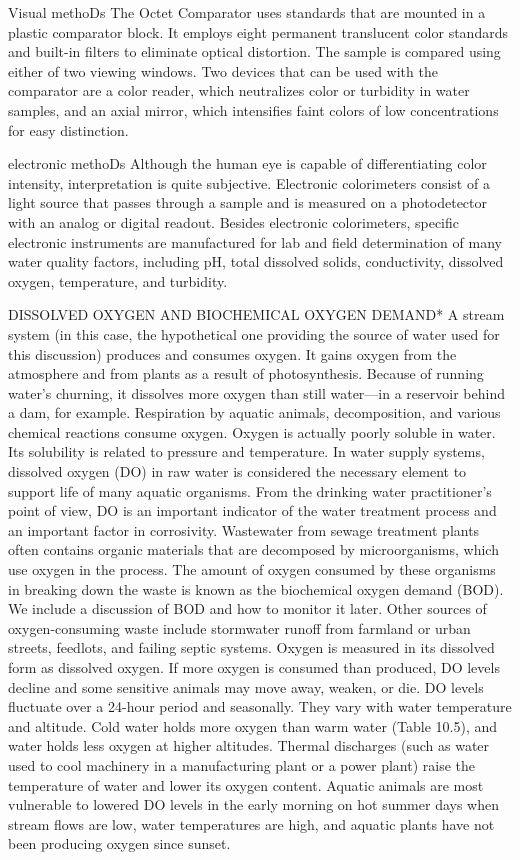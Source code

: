 \documentclass{article}
\begin{document}
Visual methoDs The Octet Comparator uses standards that are mounted in a
plastic comparator block. It employs eight permanent translucent color
standards and built-in filters to eliminate optical distortion. The
sample is compared using either of two viewing windows. Two devices that
can be used with the comparator are a color reader, which neutralizes
color or turbidity in water samples, and an axial mirror, which
intensifies faint colors of low concentrations for easy distinction.

electronic methoDs Although the human eye is capable of differentiating
color intensity, interpretation is quite subjective. Electronic
colorimeters consist of a light source that passes through a sample and
is measured on a photodetector with an analog or digital readout.
Besides electronic colorimeters, specific electronic instruments are
manufactured for lab and field determination of many water quality
factors, including pH, total dissolved solids, conductivity, dissolved
oxygen, temperature, and turbidity.

DISSOLVED OXYGEN AND BIOCHEMICAL OXYGEN DEMAND* A stream system (in this
case, the hypothetical one providing the source of water used for this
discussion) produces and consumes oxygen. It gains oxygen from the
atmosphere and from plants as a result of photosynthesis. Because of
running water's churning, it dissolves more oxygen than still water---in
a reservoir behind a dam, for example. Respiration by aquatic animals,
decomposition, and various chemical reactions consume oxygen. Oxygen is
actually poorly soluble in water. Its solubility is related to pressure
and temperature. In water supply systems, dissolved oxygen (DO) in raw
water is considered the necessary element to support life of many
aquatic organisms. From the drinking water practitioner's point of view,
DO is an important indicator of the water treatment process and an
important factor in corrosivity. Wastewater from sewage treatment plants
often contains organic materials that are decomposed by microorganisms,
which use oxygen in the process. The amount of oxygen consumed by these
organisms in breaking down the waste is known as the biochemical oxygen
demand (BOD). We include a discussion of BOD and how to monitor it
later. Other sources of oxygen-consuming waste include stormwater runoff
from farmland or urban streets, feedlots, and failing septic systems.
Oxygen is measured in its dissolved form as dissolved oxygen. If more
oxygen is consumed than produced, DO levels decline and some sensitive
animals may move away, weaken, or die. DO levels fluctuate over a
24-hour period and seasonally. They vary with water temperature and
altitude. Cold water holds more oxygen than warm water (Table 10.5), and
water holds less oxygen at higher altitudes. Thermal discharges (such as
water used to cool machinery in a manufacturing plant or a power plant)
raise the temperature of water and lower its oxygen content. Aquatic
animals are most vulnerable to lowered DO levels in the early morning on
hot summer days when stream flows are low, water temperatures are high,
and aquatic plants have not been producing oxygen since sunset.
\end{document}
